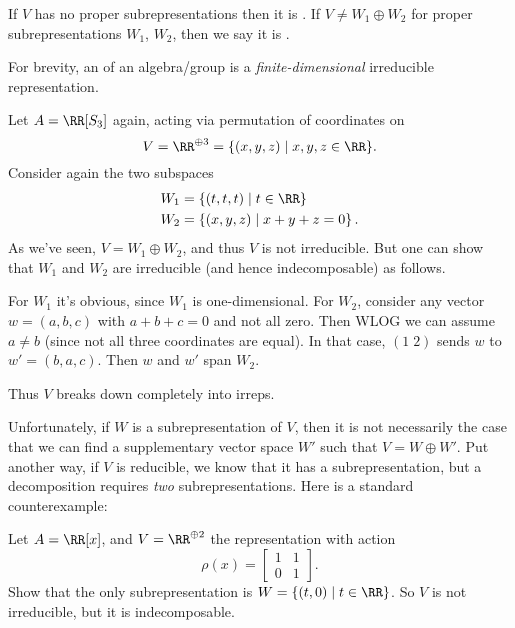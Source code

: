 \begin{definition}
	If $V$ has no proper subrepresentations then it is .
	If $V \neq W_1 \oplus W_2$ for proper subrepresentations $W_1$, $W_2$,
	then we say it is .
\end{definition}
\begin{definition}
	For brevity, an  of an algebra/group is a
	\emph{finite-dimensional} irreducible representation.
\end{definition}

\begin{example}
	Let $A = \RR[S_3]$ again, acting via permutation of coordinates on
	\[ V = \RR^{\oplus 3} = \{ (x,y,z) \mid x,y,z \in \RR \}. \]
	Consider again the two subspaces
	\begin{align*}
		W_1 &= \left\{ (t,t,t) \mid t \in \RR \right\} \\
		W_2 &= \left\{ (x,y,z) \mid x+y+z = 0 \right\}.
	\end{align*}
	As we've seen, $V = W_1 \oplus W_2$, and thus $V$ is not irreducible.
	But one can show that $W_1$ and $W_2$ are irreducible 
	(and hence indecomposable) as follows.
	\begin{itemize}
		\ii For $W_1$ it's obvious, since $W_1$ is one-dimensional.
		\ii For $W_2$, consider any vector $w = (a,b,c)$
		with $a+b+c=0$ and not all zero.  Then WLOG we can assume $a \neq b$ 
		(since not all three coordinates are equal).
		In that case, $(1 \; 2)$ sends $w$ to $w' = (b,a,c)$.
		Then $w$ and $w'$ span $W_2$.
	\end{itemize}
	Thus $V$ breaks down completely into irreps.
\end{example}

Unfortunately, if $W$ is a subrepresentation of $V$,
then it is not necessarily the case that we can find a
supplementary vector space $W'$ such that $V = W \oplus W'$.
Put another way, if $V$ is reducible, we know that it has a subrepresentation,
but a decomposition requires \emph{two} subrepresentations.
Here is a standard counterexample:
\begin{exercise}
	\label{exer:irred_not_indecomp}
	Let $A = \RR[x]$, and $V = \RR^{\oplus 2}$ the representation with action
	\[ \rho(x) = \begin{bmatrix} 1 & 1 \\ 0 & 1 \end{bmatrix}. \]
	Show that the only subrepresentation is $W = \{ (t,0) \mid t \in \RR \}$.
	So $V$ is not irreducible, but it is indecomposable.
\end{exercise}


